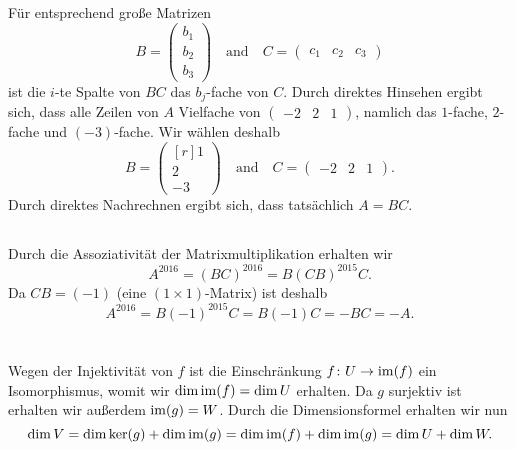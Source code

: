 \documentclass[a4paper,10pt]{article}
\begin{document}
\subsection{}
Für entsprechend große Matrizen
\[
 B = \begin{pmatrix} b_1 \\ b_2 \\ b_3 \end{pmatrix}
 \quad\text{and}\quad
 C = \begin{pmatrix} c_1 & c_2 & c_3 \end{pmatrix}
\]
ist die $i$-te Spalte von $BC$ das $b_j$-fache von $C$. Durch direktes Hinsehen ergibt sich, dass alle Zeilen von $A$ Vielfache von $\begin{pmatrix} -2 & 2 & 1 \end{pmatrix}$, namlich das $1$-fache, $2$-fache und $(-3)$-fache. Wir wählen deshalb
\[
 B = \begin{pmatrix*}[r] 1 \\ 2 \\ -3 \end{pmatrix*}
 \quad\text{and}\quad
 C = \begin{pmatrix} -2 & 2 & 1 \end{pmatrix}.
\]
Durch direktes Nachrechnen ergibt sich, dass tatsächlich $A = BC$.


\subsection{}
Durch die Assoziativität der Matrixmultiplikation erhalten wir
\[
 A^{2016}
 = (BC)^{2016}
 = B (CB)^{2015} C.
\]
Da $CB = (-1)$ (eine $(1 \times 1)$-Matrix) ist deshalb
\[
 A^{2016}
 = B (-1)^{2015} C
 = B (-1) C
 = -BC
 = -A.
\]





\section{}
Wegen der Injektivität von $f$ ist die Einschränkung $f \colon U \to \mathrm{im}(f)$ ein Isomorphismus, womit wir $\dim \mathrm{im}(f) = \dim U$ erhalten. Da $g$ surjektiv ist erhalten wir außerdem $\mathrm{im}(g) = W$. Durch die Dimensionsformel erhalten wir nun
\[
 \dim V
 = \dim \ker(g) + \dim \mathrm{im}(g)
 = \dim \mathrm{im}(f) + \dim \mathrm{im}(g)
 = \dim U + \dim W.
\]
\end{document}
